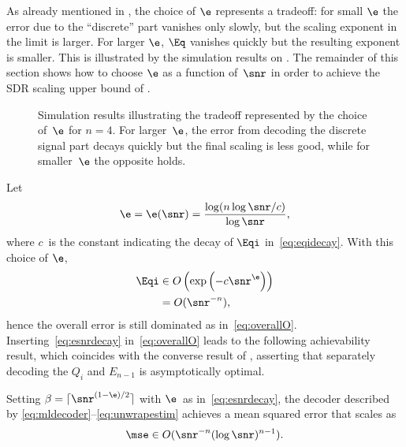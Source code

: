 As already mentioned in , the choice of $\e$ represents a
tradeoff: for small $\e$ the error due to the ``discrete'' part vanishes only
slowly, but the scaling exponent in the limit is larger. For larger $\e$, $\Eq$
vanishes quickly but the resulting exponent is smaller. This is illustrated by
the simulation results on .  The remainder of this
section shows how to choose $\e$ as a function of~$\snr$ in order to achieve the
SDR scaling upper bound of .

\begin{figure}
  \begin{center}
    
  \end{center}
  \caption{Simulation results illustrating the tradeoff represented by the
  choice of~$\e$ for $n = 4$. For larger~$\e$, the error from decoding the
  discrete signal part decays quickly but the final scaling is less good, while
  for smaller~$\e$ the opposite holds.}
  \label{fig:scalarcomparison}
\end{figure}

Let
\begin{equation}
  \label{eq:esnrdecay}
  \e = \e(\snr) = \frac{\log(n \log\snr / c)}{\log\snr},
\end{equation}
where $c$~is the constant indicating the decay of $\Eqi$ in~\eqref{eq:eqidecay}.
With this choice of $\e$,
\begin{align*}
  \Eqi &\in O\left( \exp\left( - c \snr^\e \right) \right) \\
 &= O(\snr^{-n}),
\end{align*}
hence the overall error is still dominated as in~\eqref{eq:overallO}.
Inserting~\eqref{eq:esnrdecay} in~\eqref{eq:overallO} leads to the following
achievability result, which coincides with the converse result of
, asserting that separately decoding the $Q_i$ and $E_{n-1}$
is asymptotically optimal.
\begin{theorem}
  \label{thm:scalarachievability}
  Setting $\beta = \lceil \snr^{(1-\e)/2} \rceil$ with $\e$~as
  in~\eqref{eq:esnrdecay}, the decoder described by
  \eqref{eq:mldecoder}--\eqref{eq:unwrapestim} achieves a mean squared error
  that scales as
  \begin{equation*}
    \mse \in O(\snr^{-n} (\log\snr)^{n-1}).
  \end{equation*}
\end{theorem}




